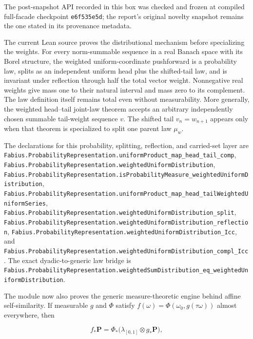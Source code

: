 \documentclass[11pt,oneside]{article}
\theoremstyle{definition}
\theoremstyle{remark}
\newcommand{\1}{\mathbf 1}
\begin{document}
\begin{statusbox}
The post-snapshot API recorded in this box was checked and frozen at compiled full-facade
checkpoint \texttt{e6f535e5d}; the report's original novelty snapshot remains the one stated
in its provenance metadata.

The current Lean source proves the distributional mechanism before specializing the
weights.  For every norm-summable sequence in a real Banach space with its Borel
structure, the weighted uniform-coordinate pushforward is a probability law, splits as
an independent uniform head plus the shifted-tail law, and is invariant under reflection
through half the total vector weight.  Nonnegative real weights give mass one to their
natural interval and mass zero to its complement.  The law definition itself remains
total even without measurability.  More generally, the weighted head--tail joint-law
theorem accepts an arbitrary independently chosen summable tail-weight sequence \(v\).
The shifted tail \(v_n=w_{n+1}\) appears only when that theorem is specialized to split
one parent law \(\mu_w\).

The declarations for this probability, splitting, reflection, and carried-set layer are
\nolinkurl{Fabius.ProbabilityRepresentation.uniformProduct_map_head_tail_comp},
\nolinkurl{Fabius.ProbabilityRepresentation.weightedUniformDistribution},
\nolinkurl{Fabius.ProbabilityRepresentation.isProbabilityMeasure_weightedUniformDistribution},
\nolinkurl{Fabius.ProbabilityRepresentation.uniformProduct_map_head_tailWeightedUniformSeries},
\nolinkurl{Fabius.ProbabilityRepresentation.weightedUniformDistribution_split},
\nolinkurl{Fabius.ProbabilityRepresentation.weightedUniformDistribution_reflection},
\nolinkurl{Fabius.ProbabilityRepresentation.weightedUniformDistribution_Icc}, and
\nolinkurl{Fabius.ProbabilityRepresentation.weightedUniformDistribution_compl_Icc}.
The exact dyadic-to-generic law bridge is
\nolinkurl{Fabius.ProbabilityRepresentation.weightedSumDistribution_eq_weightedUniformDistribution}.

The module now also proves the generic measure-theoretic engine behind affine
self-similarity.  If measurable \(g\) and \(\Phi\) satisfy
\(f(\omega)=\Phi(\omega_0,g(\tau\omega))\) almost everywhere, then

\[
 f_*\mathbf P=\Phi_*\bigl(\lambda_{[0,1]}\otimes g_*\mathbf P\bigr),
\]


\end{statusbox}
\end{document}
